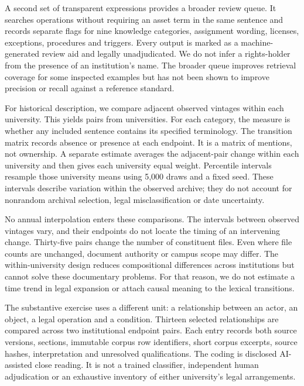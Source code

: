 \documentclass[12pt]{article}
\begin{document}
A second set of transparent expressions provides a broader review queue. It searches operations without requiring an asset term in the same sentence and records separate flags for nine knowledge categories, assignment wording, licenses, exceptions, procedures and triggers. Every output is marked as a machine-generated review aid and legally unadjudicated. We do not infer a rights-holder from the presence of an institution's name. The broader queue improves retrieval coverage for some inspected examples but has not been shown to improve precision or recall against a reference standard.

For historical description, we compare adjacent observed vintages within each university. This yields \Pairs{} pairs from \PairUniversities{} universities. For each category, the measure is whether any included sentence contains its specified terminology. The transition matrix records absence or presence at each endpoint. It is a matrix of mentions, not ownership. A separate estimate averages the adjacent-pair change within each university and then gives each university equal weight. Percentile intervals resample those university means using 5,000 draws and a fixed seed. These intervals describe variation within the observed archive; they do not account for nonrandom archival selection, legal misclassification or date uncertainty.

No annual interpolation enters these comparisons. The intervals between observed vintages vary, and their endpoints do not locate the timing of an intervening change. Thirty-five pairs change the number of constituent files. Even where file counts are unchanged, document authority or campus scope may differ. The within-university design reduces compositional differences across institutions but cannot solve these documentary problems. For that reason, we do not estimate a time trend in legal expansion or attach causal meaning to the lexical transitions.

The substantive exercise uses a different unit: a relationship between an actor, an object, a legal operation and a condition. Thirteen selected relationships are compared across two institutional endpoint pairs. Each entry records both source versions, sections, immutable corpus row identifiers, short corpus excerpts, source hashes, interpretation and unresolved qualifications. The coding is disclosed AI-assisted close reading. It is not a trained classifier, independent human adjudication or an exhaustive inventory of either university's legal arrangements.
\end{document}
